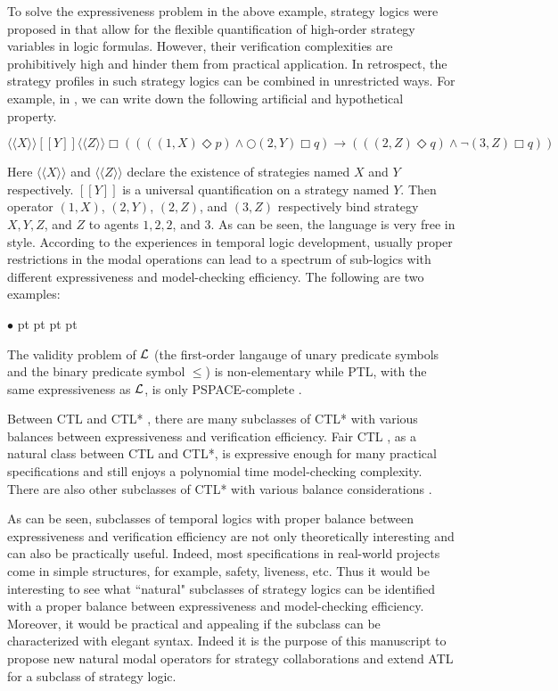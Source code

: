 \documentclass[11pt]{article}
\newcommand{\ldbrac}{[\![}
\newcommand{\rdbrac}{]\!]}
\newcommand{\ldabrac}{\langle\!\langle}
\newcommand{\rdabrac}{\rangle\!\rangle}
\newcommand{\pfrr}{\Box}
\newcommand{\pevt}{\Diamond}
\newcommand{\nxt}{\bigcirc}
\newenvironment{list1}{\begin{list}{$\bullet$}
{\topsep 0 pt \parsep 0 pt \partopsep 0 pt \itemsep 0 pt}}{\end{list}}
\begin{document}
To solve the expressiveness problem in the above example, 
strategy logics were proposed in \cite{CLM10,CHP10,MMV10} that 
allow for the flexible quantification of high-order 
strategy variables in logic formulas.  
However, their verification complexities are prohibitively high 
and hinder them from practical application.  
In retrospect, the strategy profiles in such strategy logics 
can be combined in unrestricted ways.  
For example, in \cite{MMV10}, we can 
write down the following artificial and hypothetical property.  
\begin{center} 
$\ldabrac X\rdabrac \ldbrac Y\rdbrac\ldabrac Z\rdabrac 
\pfrr ((((1,X)\pevt p) \wedge \nxt (2,Y) \pfrr q)\rightarrow
(((2,Z)\pevt q)\wedge\neg(3,Z)\pfrr q))$
\end{center} 
Here $\ldabrac X\rdabrac$ and $\ldabrac Z\rdabrac$ declare the 
existence of strategies named $X$ and $Y$ respectively.  
$\ldbrac Y\rdbrac$ is a universal quantification on a strategy named $Y$.  
Then operator $(1,X)$, $(2,Y)$, $(2,Z)$, and $(3,Z)$ 
respectively bind strategy $X, Y, Z$, and $Z$ to agents $1, 2, 2$, and $3$.  
As can be seen, the language is very free in style.  
According to the experiences in temporal logic development, 
usually proper restrictions in the modal operations can lead to 
a spectrum of sub-logics with different expressiveness and model-checking efficiency.  
The following are two examples: 
\begin{list1} 
\item The validity problem of $\cal L$ (the first-order langauge of 
  unary predicate symbols and the binary predicate symbol $\leq$) 
  is non-elementary \cite{Stockmeyer74} while 
  PTL, with the same expressiveness as $\cal L$, is only PSPACE-complete \cite{SC85}.  
\item Between CTL \cite{CES86} and CTL* \cite{EH85,EH86}, there are many subclasses of CTL* with various balances 
  between expressiveness and verification efficiency.  
  Fair CTL \cite{EL87}, as a natural class between CTL and CTL*, 
  is expressive enough for many practical specifications and 
  still enjoys a polynomial time model-checking complexity.  
  There are also other subclasses of CTL* with various balance considerations \cite{BPM83,EC80,EH86,Lamport80}.  
\end{list1} 
As can be seen, subclasses of temporal logics with proper balance between 
expressiveness and verification efficiency are not only theoretically interesting and 
can also be practically useful.  
Indeed, most specifications in real-world projects come 
in simple structures, for example, safety, liveness, etc. 
Thus it would be interesting to see what ``natural" subclasses of strategy logics 
can be identified with a proper balance between expressiveness and model-checking efficiency.  
Moreover, it would be practical and appealing if the subclass 
can be characterized with elegant syntax.  
Indeed it is the purpose of this manuscript to propose new natural modal operators 
for strategy collaborations and extend ATL for a subclass of strategy logic.  
\end{document}
